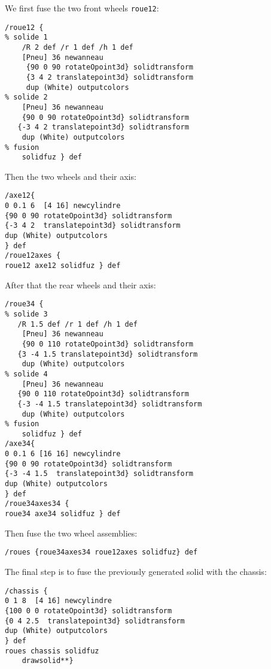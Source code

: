 \begin{compactitem}
  \item We first fuse the two front wheels \texttt{roue12}:
  \begin{verbatim}
/roue12 {
% solide 1
    /R 2 def /r 1 def /h 1 def
    [Pneu] 36 newanneau
     {90 0 90 rotateOpoint3d} solidtransform
     {3 4 2 translatepoint3d} solidtransform
     dup (White) outputcolors
% solide 2
    [Pneu] 36 newanneau
    {90 0 90 rotateOpoint3d} solidtransform
   {-3 4 2 translatepoint3d} solidtransform
    dup (White) outputcolors
% fusion
    solidfuz } def
  \end{verbatim}
  \item Then the two wheels and their axis:
  \begin{verbatim}
/axe12{
0 0.1 6  [4 16] newcylindre
{90 0 90 rotateOpoint3d} solidtransform
{-3 4 2  translatepoint3d} solidtransform
dup (White) outputcolors
} def
/roue12axes {
roue12 axe12 solidfuz } def
\end{verbatim}
  \item After that the rear wheels and their axis:
  \begin{verbatim}
/roue34 {
% solide 3
   /R 1.5 def /r 1 def /h 1 def
    [Pneu] 36 newanneau
    {90 0 110 rotateOpoint3d} solidtransform
   {3 -4 1.5 translatepoint3d} solidtransform
    dup (White) outputcolors
% solide 4
    [Pneu] 36 newanneau
   {90 0 110 rotateOpoint3d} solidtransform
   {-3 -4 1.5 translatepoint3d} solidtransform
    dup (White) outputcolors
% fusion
    solidfuz } def
/axe34{
0 0.1 6 [16 16] newcylindre
{90 0 90 rotateOpoint3d} solidtransform
{-3 -4 1.5  translatepoint3d} solidtransform
dup (White) outputcolors
} def
/roue34axes34 {
roue34 axe34 solidfuz } def
\end{verbatim}

\item Then fuse the two wheel assemblies:
\begin{verbatim}
/roues {roue34axes34 roue12axes solidfuz} def
\end{verbatim}

\item The final step is to fuse the previously generated solid with
the chassis:
\begin{verbatim}
/chassis {
0 1 8  [4 16] newcylindre
{100 0 0 rotateOpoint3d} solidtransform
{0 4 2.5  translatepoint3d} solidtransform
dup (White) outputcolors
} def
roues chassis solidfuz
    drawsolid**}
\end{verbatim}
\end{compactitem}


